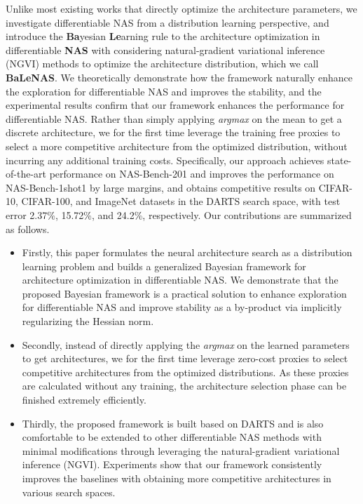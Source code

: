 \documentclass[10pt,twocolumn,letterpaper]{article}
\begin{document}
 
Unlike most existing works that directly optimize the architecture parameters, we investigate differentiable NAS from a distribution learning perspective, and introduce the \textbf{Ba}yesian \textbf{Le}arning rule \cite{khan2018fast,osawa2019practical,meng2020training,khan2020} to the architecture optimization in differentiable \textbf{NAS} with considering natural-gradient variational inference (NGVI) methods to optimize the architecture distribution, which we call \textbf{BaLeNAS}. We theoretically demonstrate how the framework naturally enhance the exploration for differentiable NAS and improves the stability, and the experimental results confirm that our framework enhances the performance for differentiable NAS. Rather than simply applying \textit{argmax} on the mean to get a discrete architecture, we for the first time leverage the training free proxies \cite{mellor2020neural,chen2021neural,abdelfattah2021zero} to select a more competitive architecture from the optimized distribution, without incurring any additional training costs. Specifically, our approach achieves state-of-the-art performance on NAS-Bench-201 \cite{BENCH102} and improves the performance on NAS-Bench-1shot1 \cite{zela2020nasbench1shot1} by large margins, and  obtains competitive results on CIFAR-10, CIFAR-100, and ImageNet datasets in the DARTS \cite{liu2018darts} search space, with test error 2.37\%, 15.72\%, and 24.2\%, respectively. Our contributions are summarized as follows.
\begin{itemize}
\item Firstly, this paper formulates the neural architecture search as a distribution learning problem and builds a generalized Bayesian framework for architecture optimization in differentiable NAS. We demonstrate that the proposed Bayesian framework is a practical solution to enhance exploration for differentiable NAS and improve  stability as a by-product via implicitly regularizing the Hessian norm. 

\item Secondly, instead of directly applying the \textit{argmax} on the learned parameters to get architectures, we for the first time leverage zero-cost proxies to select competitive architectures from the optimized distributions. As these proxies are calculated without any training, the architecture selection phase can be finished extremely efficiently.



\item Thirdly, the proposed framework is built based on DARTS and is also comfortable to be extended to other differentiable NAS methods with minimal modifications through leveraging the natural-gradient variational inference (NGVI). Experiments show that our framework consistently improves the baselines with obtaining more competitive architectures in various search spaces.





\end{itemize}
\end{document}
